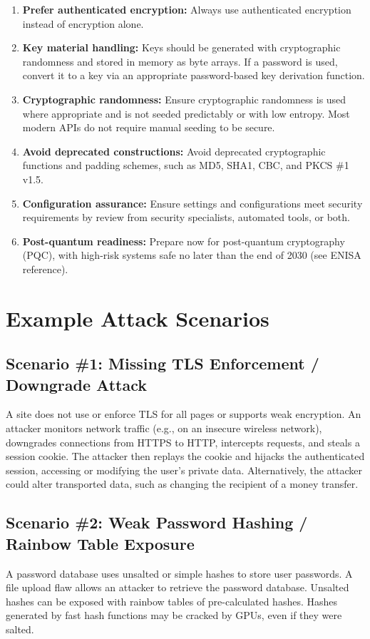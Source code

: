 \documentclass[11pt]{article}
\begin{document}
\begin{enumerate}
  \item \textbf{Prefer authenticated encryption:} Always use authenticated encryption instead of encryption alone.
  \item \textbf{Key material handling:} Keys should be generated with cryptographic randomness and stored in memory as byte arrays. If a password is used, convert it to a key via an appropriate password-based key derivation function.
  \item \textbf{Cryptographic randomness:} Ensure cryptographic randomness is used where appropriate and is not seeded predictably or with low entropy. Most modern APIs do not require manual seeding to be secure.
  \item \textbf{Avoid deprecated constructions:} Avoid deprecated cryptographic functions and padding schemes, such as MD5, SHA1, CBC, and PKCS \#1 v1.5.
  \item \textbf{Configuration assurance:} Ensure settings and configurations meet security requirements by review from security specialists, automated tools, or both.
  \item \textbf{Post-quantum readiness:} Prepare now for post-quantum cryptography (PQC), with high-risk systems safe no later than the end of 2030 (see ENISA reference).
\end{enumerate}

\section{Example Attack Scenarios}

\subsection{Scenario \#1: Missing TLS Enforcement / Downgrade Attack}
A site does not use or enforce TLS for all pages or supports weak encryption. An attacker monitors network traffic (e.g., on an insecure wireless network), downgrades connections from HTTPS to HTTP, intercepts requests, and steals a session cookie. The attacker then replays the cookie and hijacks the authenticated session, accessing or modifying the user's private data. Alternatively, the attacker could alter transported data, such as changing the recipient of a money transfer.

\subsection{Scenario \#2: Weak Password Hashing / Rainbow Table Exposure}
A password database uses unsalted or simple hashes to store user passwords. A file upload flaw allows an attacker to retrieve the password database. Unsalted hashes can be exposed with rainbow tables of pre-calculated hashes. Hashes generated by fast hash functions may be cracked by GPUs, even if they were salted.
\end{document}
